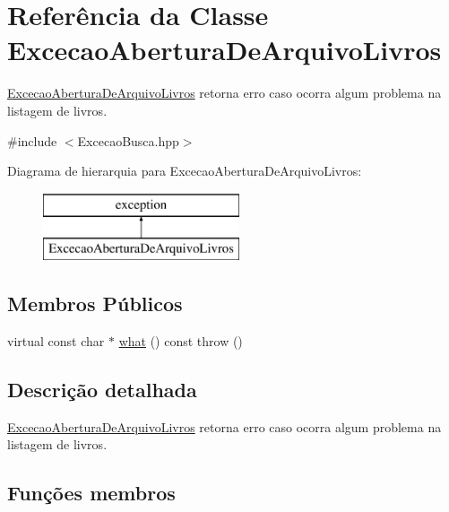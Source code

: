 \hypertarget{class_excecao_abertura_de_arquivo_livros}{}\section{Referência da Classe Excecao\+Abertura\+De\+Arquivo\+Livros}
\label{class_excecao_abertura_de_arquivo_livros}


\mbox{\hyperlink{class_excecao_abertura_de_arquivo_livros}{Excecao\+Abertura\+De\+Arquivo\+Livros}} retorna erro caso ocorra algum problema na listagem de livros.  




{\ttfamily \#include $<$Excecao\+Busca.\+hpp$>$}

Diagrama de hierarquia para Excecao\+Abertura\+De\+Arquivo\+Livros\+:\begin{figure}[H]
\begin{center}
\leavevmode
\includegraphics[height=2.000000cm]{class_excecao_abertura_de_arquivo_livros}
\end{center}
\end{figure}
\subsection*{Membros Públicos}
\begin{DoxyCompactItemize}
\item 
virtual const char $\ast$ \mbox{\hyperlink{class_excecao_abertura_de_arquivo_livros_a6d812778b17230248a7a5800489ac74d}{what}} () const  throw ()
\end{DoxyCompactItemize}


\subsection{Descrição detalhada}
\mbox{\hyperlink{class_excecao_abertura_de_arquivo_livros}{Excecao\+Abertura\+De\+Arquivo\+Livros}} retorna erro caso ocorra algum problema na listagem de livros. 

\subsection{Funções membros}
\mbox{\label{class_excecao_abertura_de_arquivo_livros_a6d812778b17230248a7a5800489ac74d}} 
